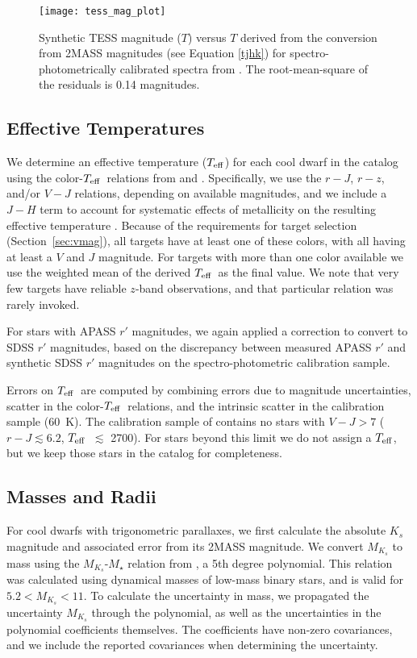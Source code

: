 \documentclass[twocolumn]{aastex62}
\newcommand{\teff}{$T_{\rm eff}$}
\begin{document}
\begin{figure}[htbp]
    \centering
    \texttt{[image: tess\_mag\_plot]}
    \caption{Synthetic TESS magnitude ($T$) versus $T$ derived from the conversion from 2MASS magnitudes (see Equation \ref{tjhk}) for spectro-photometrically calibrated spectra from \citet{Mann2015}.  The root-mean-square of the residuals is 0.14 magnitudes.}
    \label{tess_mag_plot}
\end{figure}

\subsection{Effective Temperatures}
\label{ssec:teff}
We determine an effective temperature (\teff) for each cool dwarf in the catalog using the color-\teff\ relations from \citet[][]{Mann2015} and \citet{Mann2016}. Specifically, we use the $r-J$, $r-z$, and/or $V-J$ relations, depending on available magnitudes, and we include a $J-H$ term to account for systematic effects of metallicity on the resulting effective temperature \citep[see][]{Johnson2012,Mann2013a,Newton2014}. Because of the requirements for target selection (Section~\ref{sec:vmag}), all targets have at least one of these colors, with all having at least a $V$ and $J$ magnitude. For targets with more than one color available we use the weighted mean of the derived \teff\ as the final value.  We note that very few targets have reliable $z$-band observations, and that particular relation was rarely invoked.

For stars with APASS $r'$ magnitudes, we again applied a correction to convert to SDSS $r'$ magnitudes, based on the discrepancy between measured APASS $r'$ and synthetic SDSS $r'$ magnitudes on the spectro-photometric calibration sample.

Errors on \teff\ are computed by combining errors due to magnitude uncertainties, scatter in the color-\teff\ relations, and the intrinsic scatter in the \citet{Mann2015} calibration sample (60~K).  The calibration sample of \citet{Mann2015} contains no stars with $V-J>7$ ($r-J\lesssim6.2$, \teff\ $\lesssim$ 2700).  For stars beyond this limit we do not assign a \teff, but we keep those stars in the catalog for completeness.


\subsection{Masses and Radii}

For cool dwarfs with trigonometric parallaxes, we first calculate the absolute $K_s$ magnitude and associated error from its 2MASS magnitude. We convert $M_{K_s}$ to mass using the  $M_{K_s}$-$M_\star$ relation from \citet{Benedict2016}, a 5th degree polynomial.  This relation was calculated using dynamical masses of low-mass binary stars, and is valid for $5.2<M_{K_s}<11$.  To calculate the uncertainty in mass, we propagated the uncertainty $M_{K_s}$ through the polynomial, as well as the uncertainties in the polynomial coefficients themselves.  The coefficients have non-zero covariances, and we include the reported covariances when determining the uncertainty.
\end{document}
